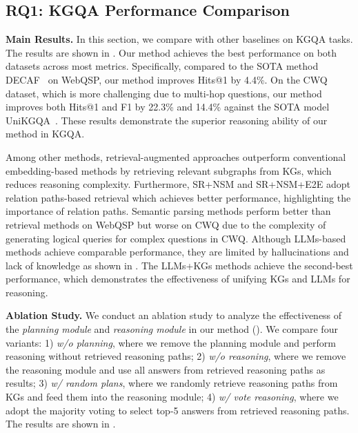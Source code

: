 

\subsection{RQ1: KGQA Performance Comparison}
\noindent\textbf{Main Results.} In this section, we compare \ourmethod with other baselines on KGQA tasks. The results are shown in . Our method achieves the best performance on both datasets across most metrics. Specifically, compared to the SOTA method DECAF~\citep{yu2022decaf} on WebQSP, our method improves Hits@1 by 4.4\%. On the CWQ dataset, which is more challenging due to multi-hop questions, our method improves both Hits@1 and F1 by 22.3\% and 14.4\% against the SOTA model UniKGQA~\citep{jiang2022unikgqa}. These results demonstrate the superior reasoning ability of our method in KGQA.

Among other methods, retrieval-augmented approaches outperform conventional embedding-based methods by retrieving relevant subgraphs from KGs, which reduces reasoning complexity. Furthermore, SR+NSM and SR+NSM+E2E adopt relation paths-based retrieval which achieves better performance, highlighting the importance of relation paths.
%
Semantic parsing methods perform better than retrieval methods on WebQSP but worse on CWQ due to the complexity of generating logical queries for complex questions in CWQ. Although LLMs-based methods achieve comparable performance, they are limited by hallucinations and lack of knowledge as shown in . The LLMs+KGs methods achieve the second-best performance, which demonstrates the effectiveness of unifying KGs and LLMs for reasoning.

\textbf{Ablation Study.} We conduct an ablation study to analyze the effectiveness of the \emph{planning module} and \emph{reasoning module} in our method (\ourmethod). We compare four variants: 1) \emph{w/o planning}, where we remove the planning module and perform reasoning without retrieved reasoning paths; 2) \emph{w/o reasoning}, where we remove the reasoning module and use all answers from retrieved reasoning paths as results; 3) \emph{w/ random plans}, where we randomly retrieve reasoning paths from KGs and feed them into the reasoning module; 4) \emph{w/ vote reasoning}, where we adopt the majority voting to select top-5 answers from retrieved reasoning paths. The results are shown in .




